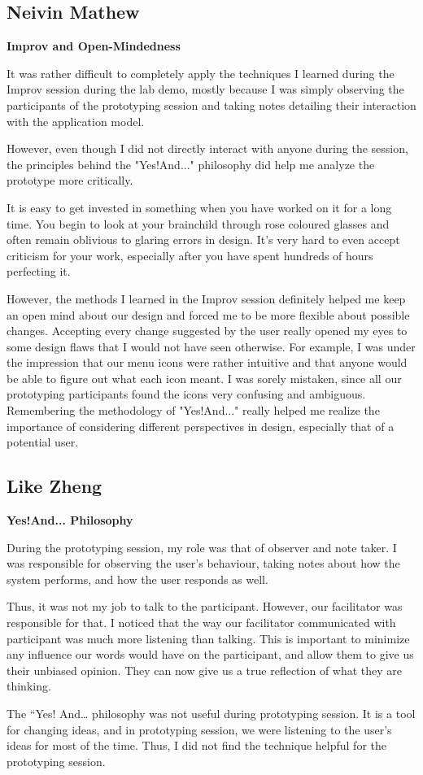\documentclass[12pt,letterpaper]{article}
\begin{document}
\subsection{Neivin Mathew}
\textbf{Improv and Open-Mindedness}\par
It was rather difficult to completely apply the techniques I learned during the Improv session during the lab demo, mostly because I was simply observing the participants of the prototyping session and taking notes detailing their interaction with the application model.\par
However, even though I did not directly interact with anyone during the session, the principles behind the "Yes!And..." philosophy did help me analyze the prototype more critically.\par 
It is easy to get invested in something when you have worked on it for a long time. You begin to look at your brainchild through rose coloured glasses and often remain oblivious to glaring errors in design. It's very hard to even accept criticism for your work, especially after you have spent hundreds of hours perfecting it. \par
However, the methods I learned in the Improv session definitely helped me keep an open mind about our design and forced me to be more flexible about possible changes. Accepting every change suggested by the user really opened my eyes to some design flaws that I would not have seen otherwise. For example, I was under the impression that our menu icons were rather intuitive and that anyone would be able to figure out what each icon meant. I was sorely mistaken, since all our prototyping participants found the icons very confusing and ambiguous. Remembering the methodology of "Yes!And..." really helped me realize the importance of considering different perspectives in design, especially that of a potential user. 

		
	
\clearpage
\subsection{Like Zheng}
\textbf{Yes!And... Philosophy}\par
During the prototyping session, my role was that of observer and note taker. I was responsible for observing the user's behaviour, taking notes about how the system performs, and how the user responds as well.\par
Thus, it was not my job to talk to the participant. However, our facilitator was responsible for that. I noticed that the way our facilitator communicated with participant was much more listening than talking. This is important to minimize any influence our words would have on the participant, and allow them to give us their unbiased opinion. They can now give us a true reflection of what they are thinking.\par 
The “Yes! And… philosophy was not useful during prototyping session. It is a tool for changing ideas, and in prototyping session, we were listening to the user's ideas for most of the time. Thus, I did not find the technique helpful for the prototyping session. 
\end{document}
